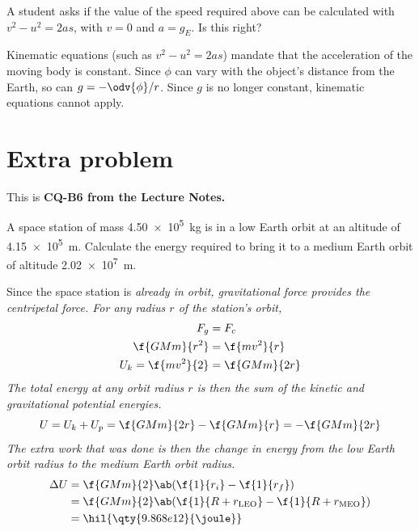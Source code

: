 \begin{problem}
A student asks if the value of the speed required above can be calculated with \(v^2 - u^2 = 2as\), with \(v = 0\) and \(a = g_E\).
Is this right?
\end{problem}

 Kinematic equations (such as \(v^2 - u^2 = 2as\)) mandate that the acceleration
of the moving body is constant. Since \(\phi\) can vary with the object's distance from the Earth,
so can \(g = -\odv{\phi}/{r}\). Since \(g\) is no longer constant, kinematic equations cannot apply.


\section{Extra problem}
This is \bf{CQ-B6} from the Lecture Notes.

\begin{problem}
A space station of mass \qty{4.50e5}{\kilogram} is in a low Earth orbit at an altitude of \qty{4.15e5}{\metre}. Calculate the
energy required to bring it to a medium Earth orbit of altitude \qty{2.02e7}{\metre}.
\end{problem}

Since the space station is \it{already} in orbit, gravitational force provides the centripetal force. For any radius \(r\) of the station's orbit,
\begin{align*}
	F_g               & = F_c         \\
	\f{GMm}{r^2}      & = \f{mv^2}{r} \\
	U_k = \f{mv^2}{2} & = \f{GMm}{2r}
\end{align*}
The total energy at any orbit radius \(r\) is then the sum of the kinetic and gravitational potential energies.
\begin{equation}
	\label{eq:te_station}
	U = U_k + U_p = \f{GMm}{2r} - \f{GMm}{r} = -\f{GMm}{2r}
\end{equation}
The extra work that was done is then the change in energy from the low Earth orbit radius to the medium Earth orbit radius.
\begin{align*}
	\Delta{U} & = \f{GMm}{2}\ab(\f{1}{r_i} - \f{1}{r_f})                           \\
	          & = \f{GMm}{2}\ab(\f{1}{R + r_\text{LEO}} - \f{1}{R + r_\text{MEO}}) \\
	          & =\hil{\qty{9.868e12}{\joule}}
\end{align*}
